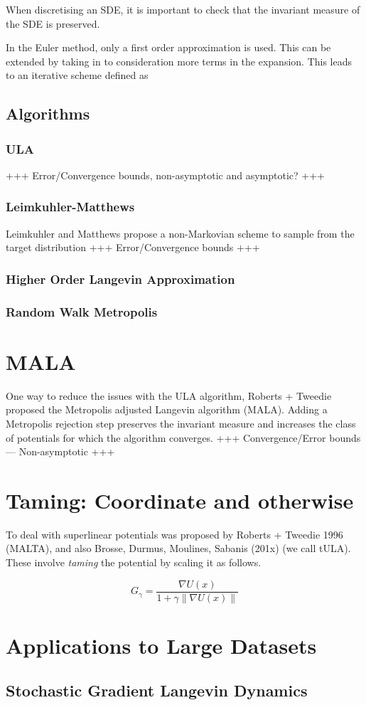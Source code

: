 \documentclass[a4paper]{article}
\theoremstyle{definition}
\begin{document}
		When discretising an SDE, it is important to check that the invariant measure of the SDE is preserved. 
		
		In the Euler method, only a first order approximation is used. This can be extended by taking in to consideration more terms in the expansion. This leads to an iterative scheme defined as
		\subsection{Algorithms}
		\subsubsection{ULA}
		+++ Error/Convergence bounds, non-asymptotic and asymptotic? +++
		\subsubsection{Leimkuhler-Matthews}
		Leimkuhler and Matthews propose a non-Markovian scheme to sample from the target distribution
			+++ Error/Convergence bounds +++
		\subsubsection{Higher Order Langevin Approximation}
		\subsubsection{Random Walk Metropolis}
		

	\section{MALA}
	One way to reduce the issues with the ULA algorithm, Roberts + Tweedie proposed the Metropolis adjusted Langevin algorithm (MALA). Adding a Metropolis rejection step preserves the invariant measure and increases the class of potentials for which the algorithm converges.
	+++ Convergence/Error bounds --- Non-asymptotic +++ 
	
	\section{Taming: Coordinate and otherwise}
	
	To deal with superlinear potentials was proposed by Roberts + Tweedie 1996 (MALTA), and also Brosse, Durmus, Moulines, Sabanis (201x) (we call tULA). These involve \emph{taming} the potential by scaling it as follows.
	
	\[G_{\gamma} = \frac{\nabla U(x)}{1+\gamma \|\nabla U(x)\|}\]
	
	
	 
	
	\section{Applications to Large Datasets}
		\subsection{Stochastic Gradient Langevin Dynamics}
\end{document}
